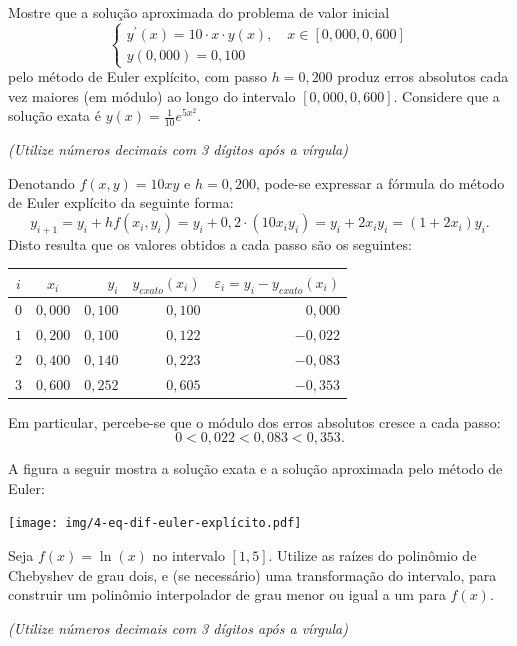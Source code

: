 \documentclass[12pt,a4paper]{article}
\begin{document}
\begin{ExerciseList}
\Exercise[title={2,0}] Mostre que a solução aproximada do problema de valor inicial
\[
\begin{cases}
y^\prime(x) = 10\cdot x \cdot y(x) , \quad x \in [0,000, 0,600]\\
y(0,000) = 0,100
\end{cases}
\]
pelo método de Euler explícito, com passo $h=0,200$ produz erros absolutos cada vez maiores (em módulo) ao longo do intervalo $[0,000, 0,600]$. Considere que a solução exata é $y(x) = \frac{1}{10}e^{5x^2}$.

{\color{blue} \textit{(Utilize números decimais com 3 dígitos após a vírgula)}}

\Answer Denotando $f(x,y) = 10 x y$ e $h=0,200$, pode-se expressar a fórmula do método de Euler explícito da seguinte forma:
\[
y_{i+1}
= y_{i} + h f(x_{i}, y_{i})
= y_{i} + 0,2 \cdot \left( 10 x_{i} y_{i} \right)
= y_{i} + 2 x_{i} y_{i}
= (1 + 2x_{i}) y_{i}.
\]
Disto resulta que os valores obtidos a cada passo são os seguintes:

\medskip
\begin{center}
\begin{tabular}{ccrrr}
\hline
$i$ & $x_i$ & $y_i$ & $y_{exato}(x_i)$ & $\varepsilon_i = y_i-y_{exato}(x_i)$ \\ \hline
$0$ & $0,000$ & $0,100$ & $0,100$ & $ 0,000$ \\
$1$ & $0,200$ & $0,100$ & $0,122$ & $-0,022$ \\
$2$ & $0,400$ & $0,140$ & $0,223$ & $-0,083$ \\
$3$ & $0,600$ & $0,252$ & $0,605$ & $-0,353$ \\ \hline
\end{tabular}
\end{center}
\medskip
Em particular, percebe-se que o módulo dos erros absolutos cresce a cada passo:
\[
0 < 0,022 < 0,083 < 0,353.
\]

A figura a seguir mostra a solução exata e a solução aproximada pelo método de Euler:
\medskip
\begin{center}
\texttt{[image: img/4-eq-dif-euler-explícito.pdf]}
\end{center}


\Exercise[title={2,0}] Seja $f(x) = \ln(x)$ no intervalo $[1, 5]$. Utilize as raízes do polinômio de Chebyshev de grau dois, e (se necessário) uma transformação do intervalo, para construir um polinômio interpolador de grau menor ou igual a um para $f(x)$.

{\color{blue} \textit{(Utilize números decimais com 3 dígitos após a vírgula)}}



\end{ExerciseList}
\end{document}
